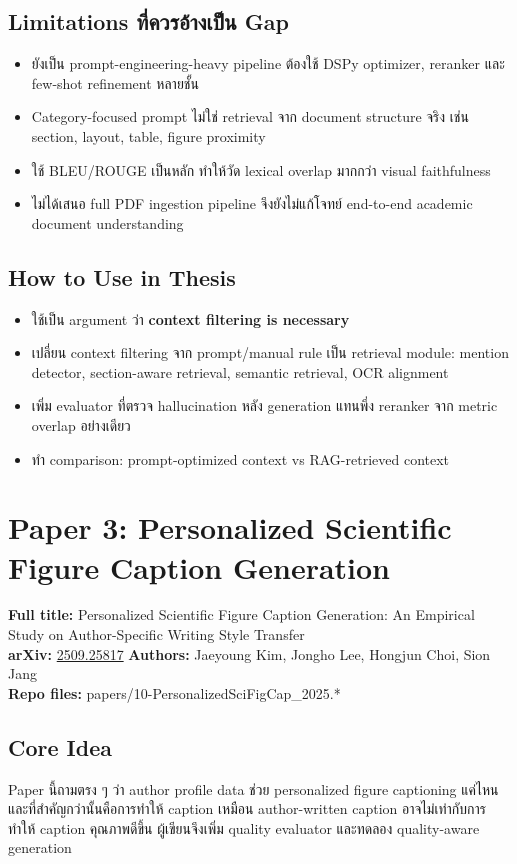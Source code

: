 \documentclass[10pt,a4paper]{article}
\begin{document}
\subsection{Limitations ที่ควรอ้างเป็น Gap}
\begin{itemize}
\item ยังเป็น prompt-engineering-heavy pipeline ต้องใช้ DSPy optimizer, reranker และ few-shot refinement หลายชั้น
\item Category-focused prompt ไม่ใช่ retrieval จาก document structure จริง เช่น section, layout, table, figure proximity
\item ใช้ BLEU/ROUGE เป็นหลัก ทำให้วัด lexical overlap มากกว่า visual faithfulness
\item ไม่ได้เสนอ full PDF ingestion pipeline จึงยังไม่แก้โจทย์ end-to-end academic document understanding
\end{itemize}

\subsection{How to Use in Thesis}
\begin{itemize}
\item ใช้เป็น argument ว่า \textbf{context filtering is necessary}
\item เปลี่ยน context filtering จาก prompt/manual rule เป็น retrieval module: mention detector, section-aware retrieval, semantic retrieval, OCR alignment
\item เพิ่ม evaluator ที่ตรวจ hallucination หลัง generation แทนพึ่ง reranker จาก metric overlap อย่างเดียว
\item ทำ comparison: prompt-optimized context vs RAG-retrieved context
\end{itemize}

\section{Paper 3: Personalized Scientific Figure Caption Generation}

\textbf{Full title:} Personalized Scientific Figure Caption Generation: An Empirical Study on Author-Specific Writing Style Transfer \\
\textbf{arXiv:} \href{https://arxiv.org/abs/2509.25817}{2509.25817} \quad
\textbf{Authors:} Jaeyoung Kim, Jongho Lee, Hongjun Choi, Sion Jang \\
\textbf{Repo files:} papers/10-PersonalizedSciFigCap\_2025.*

\subsection{Core Idea}
Paper นี้ถามตรง ๆ ว่า author profile data ช่วย personalized figure captioning แค่ไหน และที่สำคัญกว่านั้นคือการทำให้ caption เหมือน author-written caption อาจไม่เท่ากับการทำให้ caption คุณภาพดีขึ้น ผู้เขียนจึงเพิ่ม quality evaluator และทดลอง quality-aware generation
\end{document}
